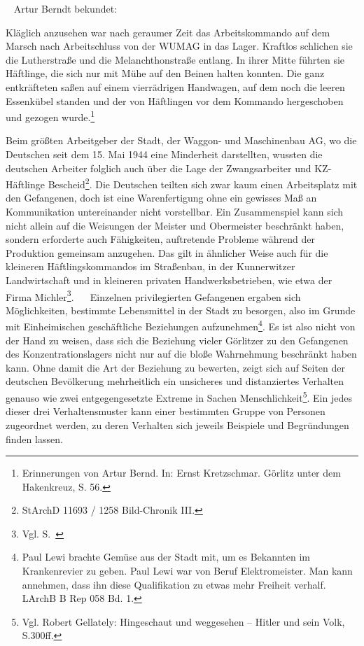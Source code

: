 \documentclass[a4paper,12pt,ngerman,
]{nisebook}
\begin{document}
~\newline
Artur Berndt bekundet:
\begin{leftbar}
Kläglich anzusehen war nach geraumer Zeit das Arbeitskommando auf dem Marsch nach Arbeitschluss von der WUMAG in das Lager. Kraftlos schlichen sie die Lutherstraße und die Melanchthonstraße entlang. In ihrer Mitte führten sie Häftlinge, die sich nur mit Mühe auf den Beinen halten konnten. Die ganz entkräfteten saßen auf einem vierrädrigen Handwagen, auf dem noch die leeren Essenkübel standen und der von Häftlingen vor dem Kommando hergeschoben und gezogen wurde.\footnote{Erinnerungen von Artur Bernd. In: Ernst Kretzschmar. Görlitz unter dem Hakenkreuz, S. 56.}
\end{leftbar}
Beim größten Arbeitgeber der Stadt, der Waggon- und Maschinenbau AG, wo die Deutschen seit dem 15. Mai 1944 eine Minderheit darstellten, wussten die deutschen Arbeiter folglich auch über die Lage der Zwangsarbeiter und KZ-Häftlinge Bescheid\footnote{StArchD 11693 / 1258 Bild-Chronik III.}. Die Deutschen teilten sich zwar kaum einen Arbeitsplatz mit den Gefangenen, doch ist eine Warenfertigung ohne ein gewisses Maß an Kommunikation untereinander nicht vorstellbar. Ein Zusammenspiel kann sich nicht allein auf die Weisungen der Meister und Obermeister beschränkt haben, sondern erforderte auch Fähigkeiten, auftretende Probleme während der Produktion gemeinsam anzugehen. Das gilt in ähnlicher Weise auch für die kleineren Häftlingskommandos im Straßenbau, in der Kunnerwitzer Landwirtschaft und in kleineren privaten Handwerksbetrieben, wie etwa der Firma Michler\footnote{Vgl. S.~\pageref{michel}}.
~\newline~
Einzelnen privilegierten Gefangenen ergaben sich Möglichkeiten, bestimmte Lebensmittel in der Stadt zu besorgen, also im Grunde mit Einheimischen geschäftliche Beziehungen aufzunehmen\footnote{Paul Lewi brachte Gemüse aus der Stadt mit, um es Bekannten im Krankenrevier zu geben. Paul Lewi war von Beruf Elektromeister. Man kann annehmen, dass ihn diese Qualifikation zu etwas mehr Freiheit verhalf. LArchB B Rep 058 Bd. 1.}.
\newline
Es ist also nicht von der Hand zu weisen, dass sich die Beziehung vieler Görlitzer zu den Gefangenen des Konzentrationslagers nicht nur auf die bloße Wahrnehmung beschränkt haben kann. Ohne damit die Art der Beziehung zu bewerten, zeigt sich auf Seiten der deutschen Bevölkerung mehrheitlich ein unsicheres und distanziertes Verhalten genauso wie zwei entgegengesetzte Extreme in Sachen Menschlichkeit\footnote{Vgl. Robert Gellately: Hingeschaut und weggesehen -- Hitler und sein Volk, S.300ff.}.
Ein jedes dieser drei Verhaltensmuster kann einer bestimmten Gruppe von Personen zugeordnet werden, zu deren Verhalten sich jeweils Beispiele und Begründungen finden lassen.
\end{document}

